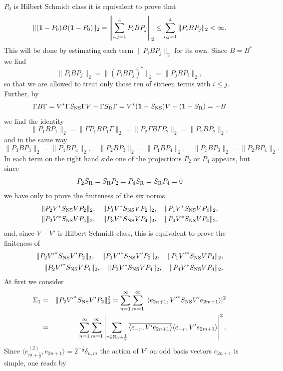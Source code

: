 \documentclass[10pt,a4paper]{article}
\begin{document}
\begin{appendix}
$P_0$ is Hilbert Schmidt class it is equivalent to
prove that
\[ \| ({\bf 1}-P_0)B({\bf 1}-P_0) \|_2 =
\left\| \sum_{i,j=1}^4 P_i B P_j \right\|_2 \le
\sum_{i,j=1}^4 \|P_i B P_j \|_2 < \infty. \]
This will be done by estimating each term $\|P_iBP_j\|_2$
for its own. Since $B=B^*$ we find
\[ \| P_i B P_j \|_2 =\|(P_i B P_j)^* \|_2 =
\|P_j B P_i\|_2,\]
so that we are allowed to treat only those ten of
sixteen terms with $i\le j$. Further, by
\[ \Gamma B \Gamma = V^* \Gamma S_{\rm NS} \Gamma V - \Gamma S_{\rm R}
\Gamma =V^* ({\bf 1} - S_{\rm NS}) V - ({\bf 1}-S_{\rm R}) = -B \]
we find the identity
\[ \|P_1BP_1\|_2 = \| \Gamma P_1BP_1 \Gamma \|_2 =
\|P_2 \Gamma B \Gamma P_2 \|_2 = \|P_2BP_2\|_2, \]
and in the same way
\[ \| P_3 B P_3 \|_2  = \| P_4 B P_4 \|_2,\quad
\| P_2 B P_3 \|_2 = \| P_1 B P_4 \|_2, \quad
\| P_1 B P_3 \|_2 = \| P_2 B P_4 \|_2. \]
In each term on the right hand side one of the projections
$P_2$ or $P_4$ appears, but since
\[ P_2 S_{\rm R} = S_{\rm R} P_2 = P_4 S_{\rm R} = S_{\rm R} P_4 = 0 \]
we have only to prove the finiteness of the six norms
\begin{eqnarray*}
\|P_2 V^* S_{\rm NS} V P_2 \|_2,\quad
\|P_1 V^* S_{\rm NS} V P_2 \|_2,\quad
\|P_1 V^* S_{\rm NS} V P_4 \|_2,\\
\|P_2 V^* S_{\rm NS} V P_4 \|_2,\quad
\|P_3 V^* S_{\rm NS} V P_4 \|_2,\quad
\|P_4 V^* S_{\rm NS} V P_4 \|_2,
\end{eqnarray*}
and, since $V-V'$ is Hilbert Schmidt class, this is
equivalent to prove the finiteness of
\begin{eqnarray*}
\|P_2 {V'}^* S_{\rm NS} V' P_2 \|_2,\quad
\|P_1 {V'}^* S_{\rm NS} V' P_2 \|_2,\quad
\|P_1 {V'}^* S_{\rm NS} V P_4 \|_2,\\
\|P_2 {V'}^* S_{\rm NS} V P_4 \|_2,\quad
\|P_3 V^* S_{\rm NS} V P_4 \|_2,\quad
\|P_4 V^* S_{\rm NS} V P_4 \|_2.
\end{eqnarray*}
At first we consider
\begin{eqnarray*} \Sigma_1 &=& \|P_2{V'}^*S_{\rm NS}V'P_2\|_2^2 =
\sum_{n=1}^\infty \sum_{m=1}^\infty | \langle e_{2n+1},
{V'}^* S_{\rm NS} V' e_{2m+1} \rangle |^2 \\
&=& \sum_{n=1}^\infty \sum_{m=1}^\infty \left|
\sum_{r \in \mathbb{N}_0 + \frac{1}{2} }
\overline{\langle e_{-r},V' e_{2n+1} \rangle} \langle
e_{-r}, V' e_{2m+1} \rangle \right|^2.
\end{eqnarray*}
Since $\langle e_{m+\frac{1}{2}}^{(2)}, e_{2n+1}\rangle =
2^{-\frac{1}{2}} \delta_{n,m}$ the action of $V'$ on odd
basis vectors $e_{2n+1}$ is simple, one reads by

\end{appendix}
\end{document}
